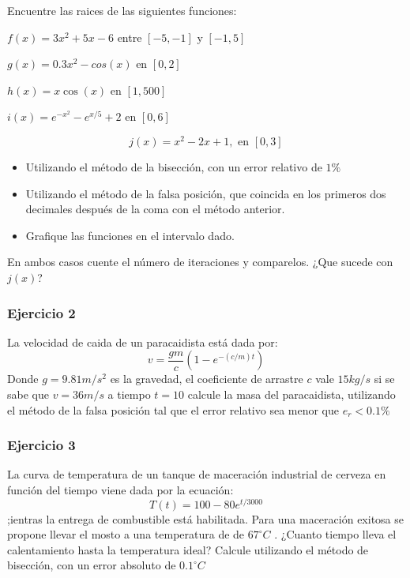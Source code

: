 \documentclass[a4paper,11pt]{article}
\theoremstyle{mytheor}
\begin{document}
Encuentre las raices de las siguientes funciones:

\begin{enumerate}
\begin{minipage}{.6\linewidth}
\item $f(x) = 3x^2 + 5x -6$ entre $[-5,-1]$ y $[-1,5]$
\item $g(x) = 0.3x^2 -cos(x)$ en $[0,2]$
\end{minipage}\begin{minipage}{.4\linewidth}
\item $h(x) = x\cos(x)$ en $[1,500]$
\item $i(x) = e^{-x^2} -e^{x/5}+2$ en $[0,6]$
\end{minipage}
$$j(x) = x^2 -2x +1, \text{ en } [0,3]$$


\begin{itemize}
\item Utilizando el método de la bisección, con un error relativo de $1\%$
\item Utilizando el método de la falsa posición, que coincida en los primeros dos decimales después de la coma con el método anterior.  
\item Grafique las funciones en el intervalo dado.
\end{itemize}
En ambos casos cuente el número de iteraciones y comparelos. ¿Que sucede con $j(x)$?

\end{enumerate}

\subsubsection*{Ejercicio 2}

La velocidad de caida de un paracaidista está dada por:
$$\displaystyle v = \frac{gm}{c} (1 - e^{ -(c/m) t})$$
Donde $g=9.81 m/s^2$ es la gravedad, el coeficiente de arrastre $c$ vale $15kg/s$ si se sabe que $v= 36 m/s$ a tiempo $t=10$ calcule la masa del paracaidista, utilizando el método de la falsa posición tal que el error relativo sea menor que $e_r < 0.1\%$


\subsubsection*{Ejercicio 3}

La curva de temperatura de un tanque de maceración industrial de cerveza en función del tiempo viene dada por la ecuación:
$$ T(t) = 100 - 80e^{t/3000}$$
;ientras la entrega de combustible está habilitada. Para una maceración exitosa se propone llevar el mosto a una temperatura de de $67^\circ C$ . ¿Cuanto tiempo lleva el calentamiento hasta la temperatura ideal? Calcule utilizando el método de bisección, con un error absoluto de $0.1^\circ C$
\end{document}
